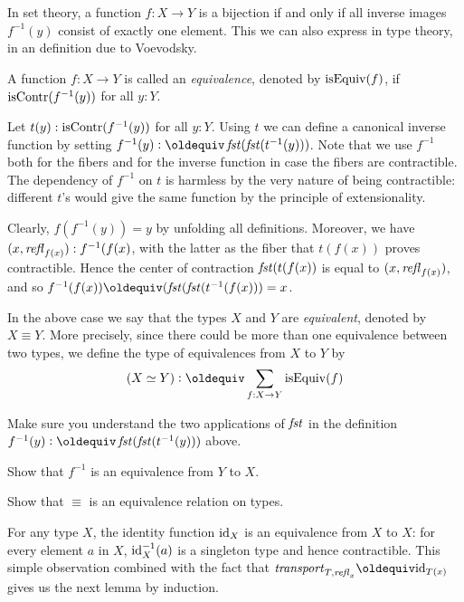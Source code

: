 In set theory, a function $f : X \to Y$ is a bijection if and only if
all inverse images $f^{-1}(y)$ consist of exactly one element.
This we can also express in type theory, in an definition due
to Voevodsky. 

\begin{definition}
\label{def:equivalence}
A function $f : X \to Y$ is called an \emph{equivalence},
denoted by $\mathrm{isEquiv}(f)$, if $\mathrm{isContr}(f^{-1}(y))$ for all $y:Y$.
\end{definition}

Let $t(y): \mathrm{isContr}(f^{-1}(y))$ for all $y:Y$.
Using $t$ we can define a canonical inverse function
by setting $f^{-1}(y)\defeq\fst(\fst(t^{-1}(y)))$.
Note that we use $f^{-1}$ both for the fibers and
for the inverse function in case the fibers are contractible.
The dependency of $f^{-1}$ on $t$ is harmless by the very nature of
being contractible: different $t$'s would give the same
function by the principle of extensionality.

Clearly, $f(f^{-1}(y)) = y$ by unfolding all definitions.
Moreover, we have $(x,\mathop{{\it refl}_{f(x)}}) : f^{-1}(f(x)$,
with the latter as the fiber that $t(f(x))$
proves contractible. Hence the center of contraction
$\mathop{\mathit{fst}}(t(f(x))$ is equal to $(x,\mathop{{\it refl}_{f(x)}})$, and so
$f^{-1}(f(x))\jdeq(\fst(\fst(t^{-1}(f(x))) = x$.

In the above case we say that the types
$X$ and $Y$ are \emph{equivalent}, denoted by $X\equiv Y$. 
More precisely, since there could be more than one equivalence
between two types, we define the type of equivalences from $X$ to $Y$ by
\[
(X\equiv Y) \defeq \sum_{f:X\to Y} \isEq(f) 
\]


\begin{xca}\label{xca:fstfstcontractiblefiber}
Make sure you understand the two applications of $\mathop{\mathit{fst}}$
in the definition $f^{-1}(y)\defeq\fst(\fst(t^{-1}(y)))$ above.
\end{xca}

\begin{xca}\label{xca:equivalence-invers}
Show that $f^{-1}$ is an equivalence from $Y$ to $X$.
\end{xca}

\begin{xca}\label{xca:equivalencerel-equivalence}
Show that $\equiv$ is an equivalence relation on types.
\end{xca}

For any type $X$, the identity function $\mathord{\mathrm{id}}_X$ is an
equivalence from $X$ to $X$: for every element $a$ in $X$,
$\mathord{\mathrm{id}}_X^{-1}(a)$ is a singleton type and hence contractible.
This simple observation combined with the fact that
$\trp_{T,\refl{x}}\jdeq \id_{T(x)}$ gives us the next
lemma by induction.

